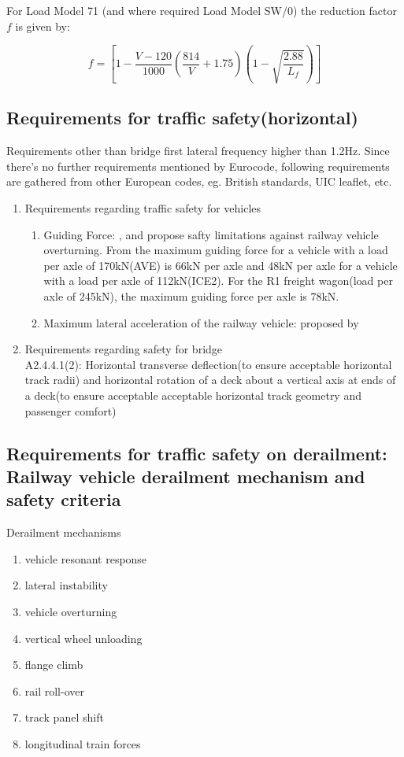 For Load Model 71 (and where required Load Model SW/0) the reduction factor $f$ is given by:

\begin{equation}
	f=[1-\frac{V-120}{1000}(\frac{814}{V}+1.75)(1-\sqrt{\frac{2.88}{L_f}})]
\end{equation}

\subsection{Requirements for traffic safety(horizontal)}
Requirements other than bridge first lateral frequency higher than 1.2Hz. Since there's no further requirements mentioned by Eurocode, following requirements are gathered from other European codes, eg. British standards, UIC leaflet, etc.

\begin{enumerate}[-]
	\item Requirements regarding traffic safety for vehicles
	\begin{enumerate}
		\item Guiding Force: \cite{code2005518} , \cite{en200714363} and\cite{cuadrado2008analysis} propose safty limitations against railway vehicle overturning. From\cite{en200714363} the maximum guiding force for a vehicle with a load per axle of 170kN(AVE) is 66kN per axle and 48kN per axle for a vehicle with a load per axle of 112kN(ICE2). For the R1 freight wagon(load per axle of 245kN), the maximum guiding force per axle is 78kN.
		\item Maximum lateral acceleration of the railway vehicle: proposed by \cite{13803}
	\end{enumerate}
	\item Requirements regarding safety for bridge\\
	\cite{EC0} A2.4.4.1(2): Horizontal transverse deflection(to ensure acceptable horizontal track radii) and horizontal rotation of a deck about a vertical axis at ends of a deck(to ensure acceptable acceptable horizontal track geometry and passenger comfort)
\end{enumerate}


\subsection{Requirements for traffic safety on derailment: Railway vehicle derailment mechanism and safety criteria}

Derailment mechanisms
\begin{enumerate}
	\item vehicle resonant response
	\item lateral instability
	\item vehicle overturning
	\item vertical wheel unloading
	\item flange climb
	\item rail roll-over
	\item track panel shift
	\item longitudinal train forces
\end{enumerate}

